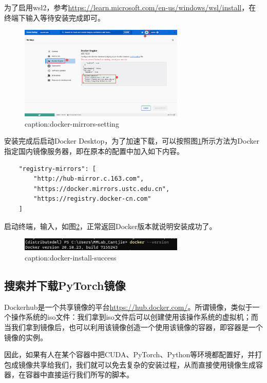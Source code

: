 为了启用wsl2，参考\url{https://learn.microsoft.com/en-us/windows/wsl/install}，在终端下输入等待安装完成即可。

\begin{figure}[htbp]
	\centering
	\includegraphics[width=0.7\textwidth]{figures/docker-mirrors-setting.png}
	\caption{caption:docker-mirrors-setting}
	\label{fig:docker-mirrors-setting}
\end{figure}

安装完成后启动Docker Desktop，为了加速下载，可以按照图\ref{fig:docker-mirrors-setting}所示方法为Docker指定国内镜像服务器，即在原本的配置中加入如下内容。
\begin{lstlisting}
    "registry-mirrors": [
        "http://hub-mirror.c.163.com",
        "https://docker.mirrors.ustc.edu.cn",
        "https://registry.docker-cn.com"
    ]
\end{lstlisting}

启动终端，输入，如图\ref{fig:docker-install-success}，正常返回Docker版本就说明安装成功了。
\begin{figure}[htbp]
	\centering
	\includegraphics[width=0.7\textwidth]{figures/docker-install-success.png}
	\caption{caption:docker-install-success}
	\label{fig:docker-install-success}
\end{figure}


\subsection{搜索并下载PyTorch镜像}

Dockerhub是一个共享镜像的平台\url{https://hub.docker.com/}。所谓镜像，类似于一个操作系统的iso文件：我们拿到iso文件后可以创建使用该操作系统的虚拟机；而当我们拿到镜像后，也可以利用该镜像创造一个使用该镜像的容器，即容器是一个镜像的实例。

因此，如果有人在某个容器中把CUDA、PyTorch、Python等环境都配置好，并打包成镜像共享给我们，我们就可以免去复杂的安装过程，从而直接使用镜像生成容器，在容器中直接运行我们所写的脚本。

